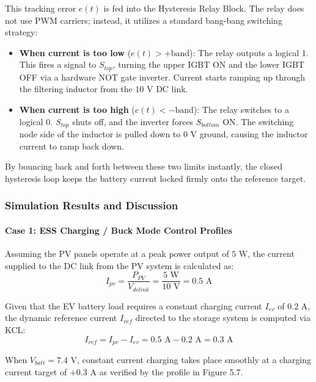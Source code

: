 This tracking error $e(t)$ is fed into the Hysteresis Relay Block. The relay does not use PWM carriers; instead, it utilizes a standard bang-bang switching strategy:
\begin{itemize}
    \item \textbf{When current is too low} ($e(t) > +\text{band}$): The relay outputs a logical 1. This fires a signal to $S_{top}$, turning the upper IGBT ON and the lower IGBT OFF via a hardware NOT gate inverter. Current starts ramping up through the filtering inductor from the $10\text{ V}$ DC link.
    \item \textbf{When current is too high} ($e(t) < -\text{band}$): The relay switches to a logical 0. $S_{top}$ shuts off, and the inverter forces $S_{bottom}$ ON. The switching node side of the inductor is pulled down to $0\text{ V}$ ground, causing the inductor current to ramp back down.
\end{itemize}
By bouncing back and forth between these two limits instantly, the closed hysteresis loop keeps the battery current locked firmly onto the reference target.

\subsubsection{Simulation Results and Discussion}

\paragraph{Case 1: ESS Charging / Buck Mode Control Profiles}
Assuming the PV panels operate at a peak power output of $5\text{ W}$, the current supplied to the DC link from the PV system is calculated as:
\begin{equation}
    I_{pv} = \frac{P_{PV}}{V_{dclink}} = \frac{5\text{ W}}{10\text{ V}} = 0.5\text{ A}
\end{equation}

Given that the EV battery load requires a constant charging current $I_{ev}$ of $0.2\text{ A}$, the dynamic reference current $I_{ref}$ directed to the storage system is computed via KCL:
\begin{equation}
    I_{ref} = I_{pv} - I_{ev} = 0.5\text{ A} - 0.2\text{ A} = 0.3\text{ A}
\end{equation}

When $V_{batt} = 7.4\text{ V}$, constant current charging takes place smoothly at a charging current target of $+0.3\text{ A}$ as verified by the profile in Figure 5.7.


